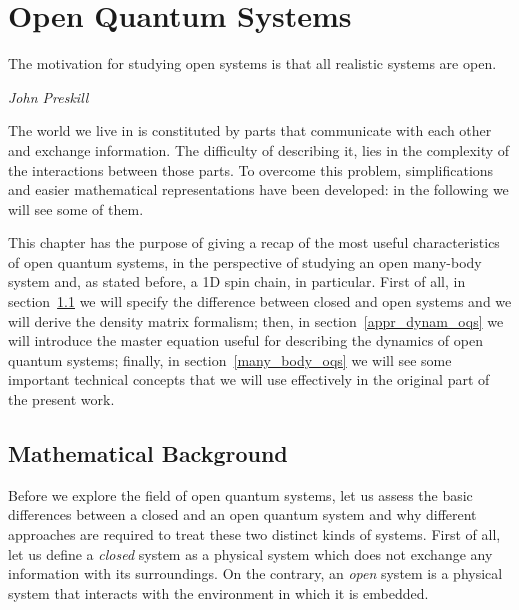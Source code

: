 \chapter{Open Quantum Systems}
\label{Chapter1}
\epigraph{The motivation for studying open systems is that all realistic systems are open.}{\textit{John Preskill}}

\newcommand{\keyword}[1]{\textbf{#1}}
\newcommand{\tabhead}[1]{\textbf{#1}}
\newcommand{\code}[1]{\texttt{#1}}
\newcommand{\file}[1]{\texttt{\bfseries#1}}
\newcommand{\option}[1]{\texttt{\itshape#1}}

The world we live in is constituted by parts that communicate with each other and exchange information. The difficulty of describing it, lies in the complexity of the interactions between those parts. To overcome this problem, simplifications and easier mathematical representations have been developed: in the following we will see some of them.

This chapter has the purpose of giving a recap of the most useful characteristics of open quantum systems, in the perspective of studying an open many-body system and, as stated before, a 1D spin chain, in particular. First of all, in section~\ref{cl_open_qs} we will specify the difference between closed and open systems and we will derive the density matrix formalism; then, in section~\ref{appr_dynam_oqs} we will introduce the master equation useful for describing the dynamics of open quantum systems; finally, in section~\ref{many_body_oqs} we will see some important technical concepts that we will use effectively in the original part of the present work.


\section{Mathematical Background}
\label{cl_open_qs}
Before we explore the field of open quantum systems, let us assess the basic differences between a closed and an open quantum system and why different approaches are required to treat these two distinct kinds of systems. First of all, let us define a \emph{closed} system as a physical system which does not exchange any information with its surroundings. On the contrary, an \emph{open} system is a physical system that interacts with the environment in which it is embedded.

